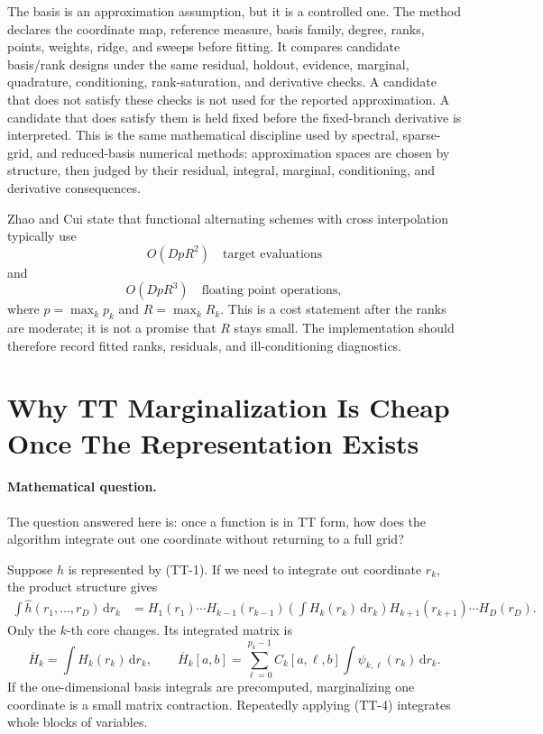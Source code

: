 \documentclass[11pt]{article}
\numberwithin{equation}{section}
\newcommand{\dd}{\,\mathrm d}
\begin{document}
The basis is an approximation assumption, but it is a controlled one.
The method declares the coordinate map, reference measure, basis family,
degree, ranks, points, weights, ridge, and sweeps before fitting.  It compares
candidate basis/rank designs under the same residual, holdout, evidence,
marginal, quadrature, conditioning, rank-saturation, and derivative checks.  A
candidate that does not satisfy these checks is not used for the reported
approximation.  A candidate that does satisfy them is held fixed before the
fixed-branch derivative is interpreted.  This is the same mathematical
discipline used by spectral, sparse-grid, and reduced-basis numerical methods:
approximation spaces are chosen by structure, then judged by their residual,
integral, marginal, conditioning, and derivative consequences.

Zhao and Cui \cite{zhao2024ttsequential} state that functional alternating schemes with cross interpolation
typically use
\begin{equation}
    O(DpR^2)\quad\text{target evaluations}
    \label{eq:p24-tt-10}
\end{equation}
and
\begin{equation}
    O(DpR^3)\quad\text{floating point operations},
    \label{eq:p24-tt-11}
\end{equation}
where \(p=\max_k p_k\) and \(R=\max_k R_k\).  This is a cost statement after
the ranks are moderate; it is not a promise that \(R\) stays small.  The
implementation should therefore record fitted ranks, residuals, and
ill-conditioning diagnostics.

\section{Why TT Marginalization Is Cheap Once The Representation Exists}

\paragraph{Mathematical question.}
The question answered here is: once a function is in TT form, how does the
algorithm integrate out one coordinate without returning to a full grid?

Suppose \(h\) is represented by (TT-1).  If we need to integrate out coordinate
\(r_k\), the product structure gives
\begin{equation}
\begin{aligned}
 \int \widehat h(r_1,\ldots,r_D)\dd r_k
 &=
 H_1(r_1)\cdots H_{k-1}(r_{k-1})
 \left(\int H_k(r_k)\dd r_k\right)
 H_{k+1}(r_{k+1})\cdots H_D(r_D).
\end{aligned}
\label{eq:p24-tt-4}
\end{equation}
Only the \(k\)-th core changes.  Its integrated matrix is
\begin{equation}
    \overline H_k
    =
    \int H_k(r_k)\dd r_k,\qquad
    \overline H_k[a,b]
    =
    \sum_{\ell=0}^{p_k-1} C_k[a,\ell,b]
    \int \psi_{k,\ell}(r_k)\dd r_k.
    \label{eq:p24-tt-5}
\end{equation}
If the one-dimensional basis integrals are precomputed, marginalizing one
coordinate is a small matrix contraction.  Repeatedly applying (TT-4) integrates
whole blocks of variables.
\end{document}
